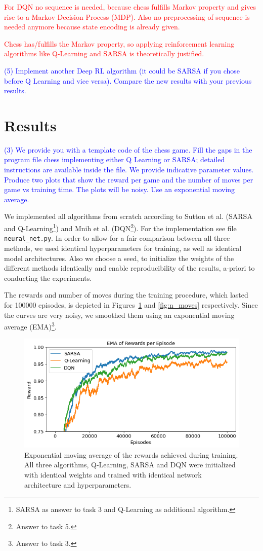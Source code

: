 \documentclass[conference]{IEEEtran}
\begin{document}
\textcolor{red}{For DQN no sequence is needed, because chess fulfills Markov property and gives rise to a Markov Decision Process (MDP). Also no preprocessing of sequence is needed anymore because state encoding is already given. \cite{atari2013} \cite{dqn2015}}

\textcolor{red}{Chess has/fulfills the Markov property, so applying reinforcement learning algorithms like Q-Learning and SARSA is theoretically justified.}

\textcolor{blue}{(5) Implement another Deep RL algorithm (it could be SARSA if you chose before Q
Learning and vice versa). Compare the new results with your previous results.}






\section{Results}\label{sec:results}

\textcolor{blue}{(3) We provide you with a template code of the chess game. Fill the gaps in the
program file chess implementing either Q Learning or SARSA; detailed instructions
are available inside the file. We provide indicative parameter values. Produce two
plots that show the reward per game and the number of moves per game vs training
time. The plots will be noisy. Use an exponential moving average.}

We implemented all algorithms from scratch according to Sutton et al. \cite{sutton2018} (SARSA and Q-Learning\footnote{SARSA as answer to task 3 and Q-Learning as additional algorithm.}) and Mnih et al. \cite{dqn2015} (DQN\footnote{Answer to task 5.}). For the implementation see file \verb"neural_net.py". In order to allow for a fair comparison between all three methods, we used identical hyperparameters for training, as well as identical model architectures. Also we choose a seed, to initialize the weights of the different methods identically and enable reproducibility of the results, a-priori to conducting the experiments. 

The rewards and number of moves during the training procedure, which lasted for 100000 episodes, is depicted in Figures~\ref{fig:rewards} and \ref{fig:n_moves} respectively. Since the curves are very noisy, we smoothed them using an exponential moving average (EMA)\footnote{Answer to task 3.}.


\begin{figure}
    \centering
    \includegraphics[width=.45\textwidth]{../figures/ema_rewards_per_episode_comparison.png}
    \caption{Exponential moving average of the rewards achieved during training. All three algorithms, Q-Learning, SARSA and DQN were initialized with identical weights and trained with identical network architecture and hyperparameters.}
    \label{fig:rewards}
\end{figure}
\end{document}
